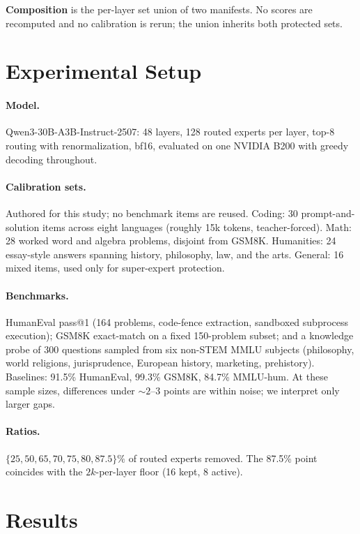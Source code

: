 \documentclass[11pt]{article}
\begin{document}
\textbf{Composition} is the per-layer set union of two manifests. No scores are
recomputed and no calibration is rerun; the union inherits both protected sets.

\section{Experimental Setup}

\paragraph{Model.} Qwen3-30B-A3B-Instruct-2507: 48 layers, 128 routed experts
per layer, top-8 routing with renormalization, bf16, evaluated on one NVIDIA
B200 with greedy decoding throughout.

\paragraph{Calibration sets.} Authored for this study; no benchmark items are
reused. Coding: 30 prompt-and-solution items across eight languages
(roughly 15k tokens, teacher-forced). Math: 28 worked word and algebra
problems, disjoint from GSM8K.
Humanities: 24 essay-style answers spanning history, philosophy, law, and the
arts. General: 16 mixed items, used only for super-expert protection.

\paragraph{Benchmarks.} HumanEval pass@1 (164 problems, code-fence extraction,
sandboxed subprocess execution); GSM8K exact-match on a fixed 150-problem
subset; and a knowledge probe of 300 questions sampled from six non-STEM MMLU
subjects (philosophy, world religions, jurisprudence, European history,
marketing, prehistory). Baselines: 91.5\% HumanEval, 99.3\% GSM8K, 84.7\%
MMLU-hum. At these sample sizes, differences under ${\sim}2$--3 points are
within noise; we interpret only larger gaps.

\paragraph{Ratios.} $\{25, 50, 65, 70, 75, 80, 87.5\}\%$ of routed experts
removed. The 87.5\% point coincides with the $2k$-per-layer floor (16 kept, 8
active).

\section{Results}
\end{document}
